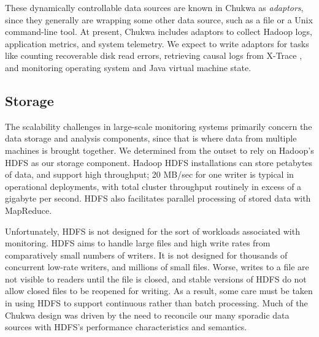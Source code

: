 \documentclass[letterpaper,twocolumn,10pt]{article}
\begin{document}
These dynamically controllable data sources are known in Chukwa as \textit{adaptors}, since they generally are wrapping some other data source, such as a file or a Unix command-line tool.  At present, Chukwa includes adaptors to collect Hadoop logs, application metrics, and system telemetry. We expect to write adaptors for tasks like counting recoverable disk read errors, retrieving causal logs from X-Trace \cite{xtrace}, and monitoring operating system and Java virtual machine state.

% 


\subsection{Storage}

The scalability challenges in large-scale monitoring systems primarily concern the data storage and analysis components, since that is where data from multiple machines is brought together. We determined from the outset to rely on Hadoop's HDFS as our storage component. Hadoop HDFS installations can store petabytes of data, and support high throughput; 20 MB/sec for one writer is typical in operational deployments, with total cluster throughput routinely in excess of a gigabyte per second. HDFS also facilitates parallel processing of stored data with MapReduce.

Unfortunately, HDFS is not designed for the sort of workloads associated with monitoring. HDFS aims to handle large files and high write rates from comparatively small numbers of writers. It is not designed for thousands of concurrent low-rate writers, and millions of small files. Worse, writes to a file are not visible to readers until the file is closed, and stable versions of HDFS do not allow closed files to be reopened for writing. As a result, some care must be taken in using HDFS to support continuous rather than batch processing.
 Much of the Chukwa design was driven by the need to reconcile our many sporadic data sources with HDFS's performance characteristics and semantics.
 
\end{document}
